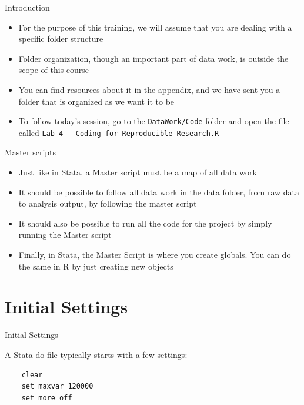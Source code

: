 \documentclass[ignorenonframetext,]{beamer}
\providecommand{\tightlist}{%
  \setlength{\itemsep}{0pt}\setlength{\parskip}{0pt}}
\begin{document}
\begin{frame}[fragile]{Introduction}

\begin{itemize}
\tightlist
\item
  For the purpose of this training, we will assume that you are dealing
  with a specific folder structure
\item
  Folder organization, though an important part of data work, is outside
  the scope of this course
\item
  You can find resources about it in the appendix, and we have sent you
  a folder that is organized as we want it to be
\item
  To follow today's session, go to the \texttt{DataWork/Code} folder and
  open the file called
  \texttt{Lab\ 4\ -\ Coding\ for\ Reproducible\ Research.R}
\end{itemize}

\end{frame}

\begin{frame}{Master scripts}

\begin{itemize}
\tightlist
\item
  Just like in Stata, a Master script must be a map of all data work
\item
  It should be possible to follow all data work in the data folder, from
  raw data to analysis output, by following the master script
\item
  It should also be possible to run all the code for the project by
  simply running the Master script
\item
  Finally, in Stata, the Master Script is where you create globals. You
  can do the same in R by just creating new objects
\end{itemize}

\end{frame}

\section{Initial Settings}\label{initial-settings}

\begin{frame}[fragile]{Initial Settings}

A Stata do-file typically starts with a few settings:

\begin{verbatim}
    clear
    set maxvar 120000
    set more off
\end{verbatim}

\end{frame}
\end{document}
